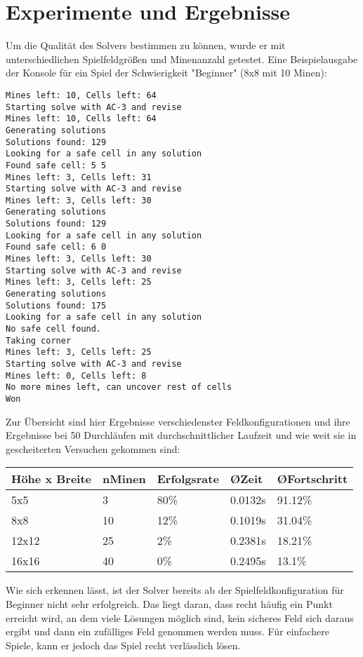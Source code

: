 %
\graphicspath{{chapters/images/}}
\section{Experimente und Ergebnisse}

Um die Qualität des Solvers bestimmen zu können, wurde er mit unterschiedlichen Spielfeldgrößen und Minenanzahl getestet. Eine Beispielausgabe
der Konsole für ein Spiel der Schwierigkeit "Beginner" (8x8 mit 10 Minen):
\begin{lstlisting}[basicstyle=\tiny]
Mines left: 10, Cells left: 64
Starting solve with AC-3 and revise
Mines left: 10, Cells left: 64
Generating solutions
Solutions found: 129
Looking for a safe cell in any solution
Found safe cell: 5 5
Mines left: 3, Cells left: 31
Starting solve with AC-3 and revise
Mines left: 3, Cells left: 30
Generating solutions
Solutions found: 129
Looking for a safe cell in any solution
Found safe cell: 6 0
Mines left: 3, Cells left: 30
Starting solve with AC-3 and revise
Mines left: 3, Cells left: 25
Generating solutions
Solutions found: 175
Looking for a safe cell in any solution
No safe cell found.
Taking corner
Mines left: 3, Cells left: 25
Starting solve with AC-3 and revise
Mines left: 0, Cells left: 8
No more mines left, can uncover rest of cells
Won
\end{lstlisting}
\clearpage
Zur Übersicht sind hier Ergebnisse verschiedenster Feldkonfigurationen und ihre Ergebnisse bei 50 Durchläufen mit durchschnittlicher Laufzeit
und wie weit sie in gescheiterten Versuchen gekommen sind:\\

\begin{tabular}{ |p{3cm}|p{2cm}|p{2cm}|p{2cm}|p{2cm}|  }
    \hline
    Höhe x Breite& nMinen& Erfolgsrate &\O Zeit&\O Fortschritt\\
    \hline
    5x5     &3  & 80\%  & 0.0132s   & 91.12\%\\
    8x8     &10 & 12\%  & 0.1019s   & 31.04\%\\
    12x12   &25 & 2\%   & 0.2381s   & 18.21\%\\
    16x16   &40 & 0\%   & 0.2495s   & 13.1\%\\
    \hline
\end{tabular}

Wie sich erkennen lässt, ist der Solver bereits ab der Spielfeldkonfiguration für Beginner nicht sehr erfolgreich. Das liegt daran, dass recht häufig
ein Punkt erreicht wird, an dem viele Lösungen möglich sind, kein sicheres Feld sich daraus ergibt und dann ein zufälliges Feld genommen werden muss.
Für einfachere Spiele, kann er jedoch das Spiel recht verlässlich lösen.